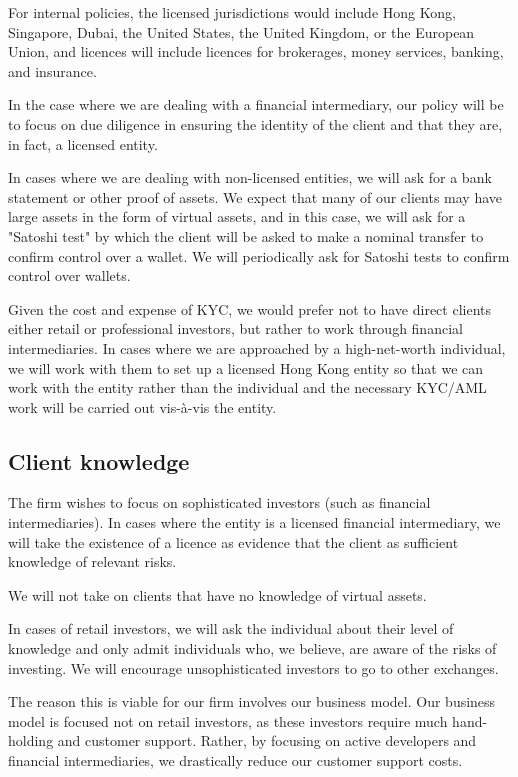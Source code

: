 For internal policies, the licensed jurisdictions would
include Hong Kong, Singapore, Dubai, the United States, the United
Kingdom, or the European Union, and licences will include licences for
brokerages, money services, banking, and insurance.

In the case where we are dealing with a financial intermediary, our
policy will be to focus on due diligence in ensuring the identity of
the client and that they are, in fact, a licensed entity.

In cases where we are dealing with non-licensed entities, we will ask
for a bank statement or other proof of assets.  We expect that many of
our clients may have large assets in the form of virtual assets, and
in this case, we will ask for a "Satoshi test" by which the client
will be asked to make a nominal transfer to confirm control over a
wallet.  We will periodically ask for Satoshi tests to confirm control
over wallets.

Given the cost and expense of KYC, we would prefer not to have direct
clients either retail or professional investors, but rather to work
through financial intermediaries.  In cases where we are approached by
a high-net-worth individual, we will work with them to set up a licensed
Hong Kong entity so that we can work with the entity rather than the
individual and the necessary KYC/AML work will be carried out vis-à-vis the entity.

\subsection{Client knowledge}

The firm wishes to focus on sophisticated investors (such as financial
intermediaries).  In cases where the entity is a licensed
financial intermediary, we will take the existence of a licence as
evidence that the client as sufficient knowledge of relevant risks.

We will not take on clients that have no knowledge of virtual assets.

In cases of retail investors, we will ask the individual about their
level of knowledge and only admit individuals who, we believe, are
aware of the risks of investing.  We will encourage unsophisticated
investors to go to other exchanges.

The reason this is viable for our firm involves our business model.
Our business model is focused not on retail investors, as these
investors require much hand-holding and customer support.  Rather, by
focusing on active developers and financial intermediaries, we
drastically reduce our customer support costs.

